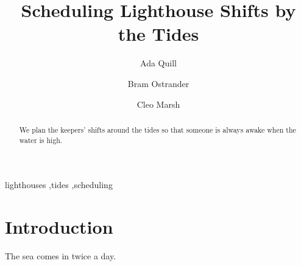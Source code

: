 \documentclass[preprint,12pt]{elsarticle}
\begin{document}
\begin{frontmatter}

\title{Scheduling Lighthouse Shifts by the Tides}

\author[harbour]{Ada Quill}
\author[harbour,tide]{Bram Ostrander}
\author[tide]{Cleo Marsh}


\begin{abstract}
  We plan the keepers' shifts around the tides so that someone is always awake when the water
  is high.
\end{abstract}

\begin{keyword}
lighthouses \sep tides \sep scheduling
\end{keyword}

\end{frontmatter}

\section{Introduction}

The sea comes in twice a day.
\end{document}
